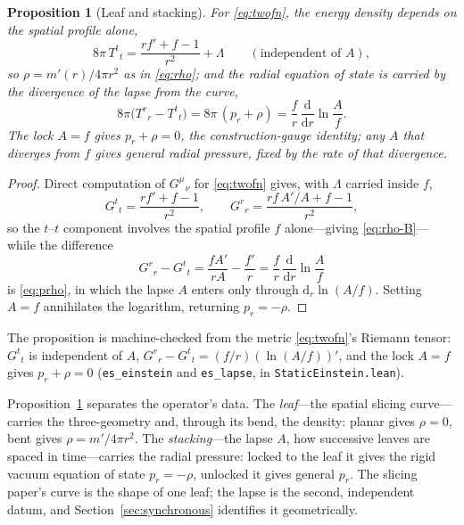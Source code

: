 \documentclass[11pt,a4paper]{article}
\newtheorem{proposition}[theorem]{Proposition}
\theoremstyle{definition}
\newcommand{\dd}{\mathrm{d}}
\newcommand{\Tud}[2]{T^{#1}{}_{#2}}
\begin{document}
\begin{proposition}[Leaf and stacking]\label{prop:lapse}
For \eqref{eq:twofn}, the energy density depends on the spatial profile alone,
\begin{equation}\label{eq:rho-B}
8\pi\,\Tud{t}{t}=\frac{r f'+f-1}{r^{2}}+\Lambda
\qquad(\text{independent of }A),
\end{equation}
so $\rho=m'(r)/4\pi r^{2}$ as in \eqref{eq:rho}; and the radial equation of state is carried by the divergence of the lapse from the curve,
\begin{equation}\label{eq:prho}
8\pi\bigl(\Tud{r}{r}-\Tud{t}{t}\bigr)=8\pi\,(p_{r}+\rho)=\frac{f}{r}\,\frac{\dd}{\dd r}\ln\!\frac{A}{f}.
\end{equation}
The lock $A=f$ gives $p_{r}+\rho=0$, the construction-gauge identity; any $A$ that diverges from $f$ gives general radial pressure, fixed by the rate of that divergence.
\end{proposition}

\begin{proof}
Direct computation of $G^{\mu}{}_{\nu}$ for \eqref{eq:twofn} gives, with $\Lambda$ carried inside $f$,
\[
G^{t}{}_{t}=\frac{r f'+f-1}{r^{2}},\qquad
G^{r}{}_{r}=\frac{r f\,A'/A+f-1}{r^{2}},
\]
so the $t$--$t$ component involves the spatial profile $f$ alone---giving \eqref{eq:rho-B}---while the difference
\[
G^{r}{}_{r}-G^{t}{}_{t}=\frac{f A'}{rA}-\frac{f'}{r}=\frac{f}{r}\,\frac{\dd}{\dd r}\ln\!\frac{A}{f}
\]
is \eqref{eq:prho}, in which the lapse $A$ enters only through $\dd_{r}\ln(A/f)$. Setting $A=f$ annihilates the logarithm, returning $p_{r}=-\rho$.
\end{proof}

The proposition is machine-checked from the metric \eqref{eq:twofn}'s Riemann tensor: $G^{t}{}_{t}$ is independent of $A$, $G^{r}{}_{r}-G^{t}{}_{t}=(f/r)(\ln(A/f))'$, and the lock $A=f$ gives $p_{r}+\rho=0$ (\texttt{es\_einstein} and \texttt{es\_lapse}, in \texttt{StaticEinstein.lean}).

Proposition~\ref{prop:lapse} separates the operator's data. The \emph{leaf}---the spatial slicing curve---carries the three-geometry and, through its bend, the density: planar gives $\rho=0$, bent gives $\rho=m'/4\pi r^{2}$. The \emph{stacking}---the lapse $A$, how successive leaves are spaced in time---carries the radial pressure: locked to the leaf it gives the rigid vacuum equation of state $p_{r}=-\rho$, unlocked it gives general $p_{r}$. The slicing paper's curve is the shape of one leaf; the lapse is the second, independent datum, and Section~\ref{sec:synchronous} identifies it geometrically.
\end{document}
